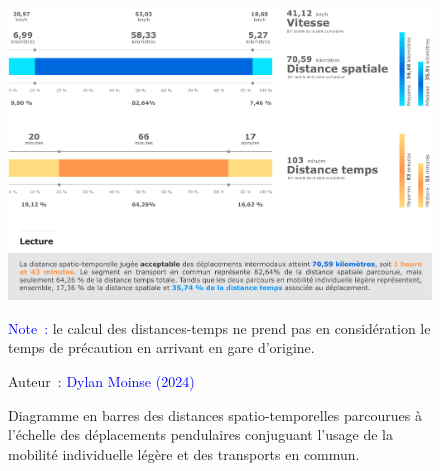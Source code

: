 \begin{refsegment}
    \begin{figure}[h!]\vspace*{4pt}
        \caption{Diagramme en barres des distances spatio-temporelles parcourues à l'échelle des déplacements pendulaires conjuguant l'usage de la mobilité individuelle légère et des transports en commun.}
        \label{fig-chap5:distances-globales}
        \centerline{\includegraphics[width=1\columnwidth]{src/Figures/Chap-5/FR_Distances_Globales.pdf}}
        \vspace{5pt}
        \begin{flushleft}\scriptsize{
        \textcolor{blue}{Note~:} le calcul des distances-temps ne prend pas en considération le temps de précaution en arrivant en gare d'origine.
        }\end{flushleft}
        \begin{flushright}\scriptsize{
        Auteur~: \textcolor{blue}{Dylan Moinse (2024)}
        }\end{flushright}
    \end{figure}


\end{refsegment}
